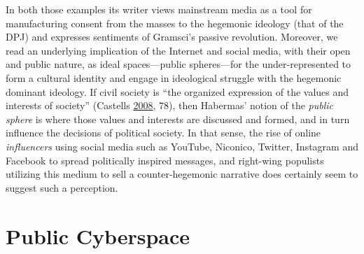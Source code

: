 \documentclass[10pt,british,A4paper,oneside]{memoir}
\begin{document}
In both those examples its writer views mainstream media as a tool for
manufacturing consent from the masses to the hegemonic ideology (that of
the DPJ) and expresses sentiments of Gramsci's passive revolution.
Moreover, we read an underlying implication of the Internet and social
media, with their open and public nature, as ideal spaces—public spheres—for the
under-represented to form a cultural identity and engage in ideological
struggle with the hegemonic dominant ideology. If civil society is ``the
organized expression of the values and interests of society'' (Castells
\protect\hyperlink{ref-castells_new_2008}{2008}, 78), then Habermas'
notion of the \emph{public sphere} is where those values and interests
are discussed and formed, and in turn influence the decisions of
political society. In that sense, the rise of online \emph{influencers} using social
media such as YouTube, Niconico, Twitter, Instagram and Facebook to
spread politically inspired messages, and right-wing populists utilizing
this medium to sell a counter-hegemonic narrative does certainly seem to
suggest such a perception.

\section{Public Cyberspace}\label{public-cyberspace}
\end{document}
